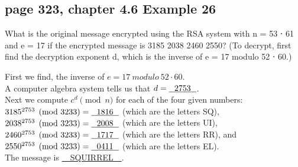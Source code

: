 \documentclass[sigconf]{acmart}
\begin{document}
\subsection{page 323, chapter 4.6 Example 26}
\begin{shaded}
    What is the original message encrypted using the RSA system with n = 53 ⋅ 61 and e = 17 if the encrypted message is 3185 2038 2460 2550? (To decrypt, first find the decryption exponent d, which is the inverse of e = 17 modulo 52 ⋅ 60.)
\end{shaded} 
First we find, the inverse of $e = 17~modulo~52 \cdot 60$. \\
A computer algebra system tells us that $d = \uline{~~2753~~}$.\\
Next we compute $c^d \pmod{n}$ for each of the four given numbers:\\ 
$3185^{2753} \pmod{3233} = \uline{~~1816~~}$ (which are the letters SQ),\\
$2038^{2753} \pmod{3233} = \uline{~~2008~~}$ (which are the letters UI),\\
$2460^{2753} \pmod{3233} = \uline{~~1717~~}$ (which are the letters RR), and \\
$2550^{2753} \pmod{3233} = \uline{~~0411~~}$ (which are the letters EL).\\
The message is \uline{~~SQUIRREL~~}.

\vspace{15cm}
\end{document}
